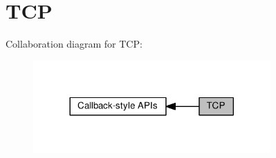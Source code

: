 \hypertarget{group__lwip__opts__tcp}{}\section{T\+CP}
\label{group__lwip__opts__tcp}
Collaboration diagram for T\+CP\+:
\nopagebreak
\begin{figure}[H]
\begin{center}
\leavevmode
\includegraphics[width=257pt]{group__lwip__opts__tcp}
\end{center}
\end{figure}
